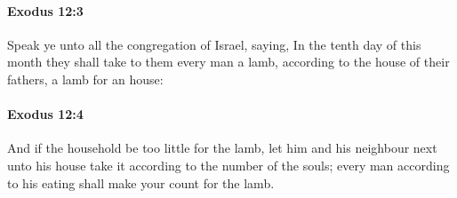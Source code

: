 		\paragraph{Exodus 12:3} %
			\label{EXODUS-12-3}

			Speak ye unto all the congregation of Israel, saying, In the tenth day of this month they shall take to them every man a lamb, according to the house of their fathers, a lamb for an house:


		\paragraph{Exodus 12:4} %
			\label{EXODUS-12-4}

			And if the household be too little for the lamb, let him and his neighbour next unto his house take it according to the number of the souls; every man according to his eating shall make your count for the lamb.

